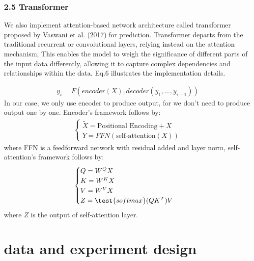 \documentclass[10pt,letterpaper]{article}
\begin{document}
\subsubsection* {2.5 Transformer}
We also implement attention-based network architecture called transformer proposed by Vaswani et al. (2017) for prediction. Transformer departs from the traditional recurrent or convolutional layers, relying instead on the attention mechanism, This enables the model to weigh the significance of different parts of the input data differently, allowing it to capture complex dependencies and relationships within the data. Eq.6 illustrates the implementation details.

\begin{eqnarray}
\label{eq: Transformer}
    y_i = F(encoder(X), decoder(y_1,...,y_{i - 1}))
\end{eqnarray}
In our case, we only use encoder to produce output, for we don't need to produce output one by one. Encoder's framework follows by:
\begin{eqnarray}
\label{eq: TransformerDecoder}
    \begin {cases} \tilde{X} = \text{Positional Encoding} + X
    \\Y = FFN(\text{self-attention}(X))
    \end {cases}
\end{eqnarray}
where FFN is a feedforward network with residual added and layer norm, self-attention's framework follows by:
\begin{eqnarray}
\label{eq: self-attention}
    \begin {cases} Q = W^QX
    \\K = W^KX
    \\V = W^VX
    \\Z = \test{softmax}(QK^T)V
    \end {cases}
\end{eqnarray}
where $Z$ is the output of self-attention layer.

\section*{data and experiment design}
\end{document}
